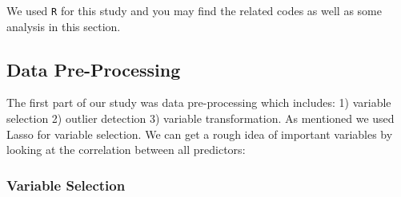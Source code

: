\documentclass[../main.tex]{subfiles}
\begin{document}
\noindent We used \texttt{R} for this study and you may find the related codes as well as some analysis in this section.

\subsection{Data Pre-Processing}
\noindent The first part of our study was data pre-processing which includes: 1) variable selection 2) outlier detection 3) variable transformation. As mentioned we used Lasso for variable selection. We can get a rough idea of important variables by looking at the correlation between all predictors:






\vspace{1cm}
\subsubsection{Variable Selection}
\begin{Shaded}
\begin{Highlighting}[]
\NormalTok{(}\NormalTok{)}
\StringTok{ }\NormalTok{(}\NormalTok{)}
\StringTok{ }\NormalTok{(}
\end{Highlighting}
\end{Shaded}

\begin{Shaded}
\begin{Highlighting}[]
\StringTok{ }\OperatorTok{\$}
\NormalTok{(Red_wine[,}\OperatorTok{-}\NormalTok{(}\NormalTok{)], } \NormalTok{, } \NormalTok{)}
\NormalTok{(}\NormalTok{(Red_wine[,}\OperatorTok{-}\NormalTok{(}\NormalTok{)]),} \NormalTok{)}
\end{Highlighting}
\end{Shaded}
\end{document}
